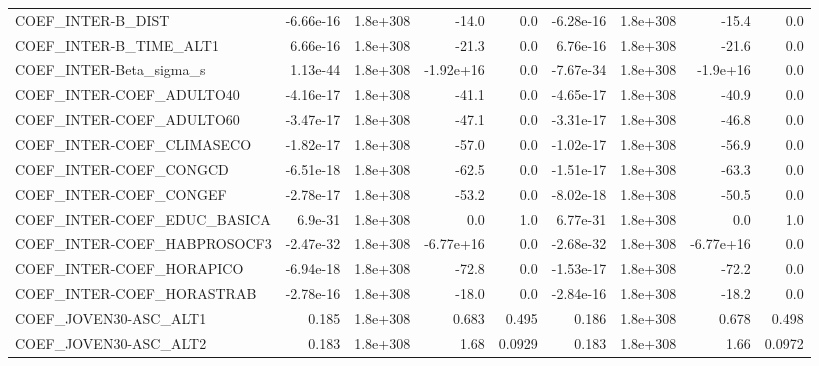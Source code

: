 \begin{tabular}{lrrrrrrrr}
COEF\_INTER-B\_DIST                 &   -6.66e-16 &     1.8e+308 &     -14.0 &      0.0 &  -6.28e-16 &    1.8e+308 &        -15.4 &           0.0 \\
COEF\_INTER-B\_TIME\_ALT1            &    6.66e-16 &     1.8e+308 &     -21.3 &      0.0 &   6.76e-16 &    1.8e+308 &        -21.6 &           0.0 \\
COEF\_INTER-Beta\_sigma\_s           &    1.13e-44 &     1.8e+308 & -1.92e+16 &      0.0 &  -7.67e-34 &    1.8e+308 &     -1.9e+16 &           0.0 \\
COEF\_INTER-COEF\_ADULTO40          &   -4.16e-17 &     1.8e+308 &     -41.1 &      0.0 &  -4.65e-17 &    1.8e+308 &        -40.9 &           0.0 \\
COEF\_INTER-COEF\_ADULTO60          &   -3.47e-17 &     1.8e+308 &     -47.1 &      0.0 &  -3.31e-17 &    1.8e+308 &        -46.8 &           0.0 \\
COEF\_INTER-COEF\_CLIMASECO         &   -1.82e-17 &     1.8e+308 &     -57.0 &      0.0 &  -1.02e-17 &    1.8e+308 &        -56.9 &           0.0 \\
COEF\_INTER-COEF\_CONGCD            &   -6.51e-18 &     1.8e+308 &     -62.5 &      0.0 &  -1.51e-17 &    1.8e+308 &        -63.3 &           0.0 \\
COEF\_INTER-COEF\_CONGEF            &   -2.78e-17 &     1.8e+308 &     -53.2 &      0.0 &  -8.02e-18 &    1.8e+308 &        -50.5 &           0.0 \\
COEF\_INTER-COEF\_EDUC\_BASICA       &     6.9e-31 &     1.8e+308 &       0.0 &      1.0 &   6.77e-31 &    1.8e+308 &          0.0 &           1.0 \\
COEF\_INTER-COEF\_HABPROSOCF3       &   -2.47e-32 &     1.8e+308 & -6.77e+16 &      0.0 &  -2.68e-32 &    1.8e+308 &    -6.77e+16 &           0.0 \\
COEF\_INTER-COEF\_HORAPICO          &   -6.94e-18 &     1.8e+308 &     -72.8 &      0.0 &  -1.53e-17 &    1.8e+308 &        -72.2 &           0.0 \\
COEF\_INTER-COEF\_HORASTRAB         &   -2.78e-16 &     1.8e+308 &     -18.0 &      0.0 &  -2.84e-16 &    1.8e+308 &        -18.2 &           0.0 \\
COEF\_JOVEN30-ASC\_ALT1             &       0.185 &     1.8e+308 &     0.683 &    0.495 &      0.186 &    1.8e+308 &        0.678 &         0.498 \\
COEF\_JOVEN30-ASC\_ALT2             &       0.183 &     1.8e+308 &      1.68 &   0.0929 &      0.183 &    1.8e+308 &         1.66 &        0.0972 \\

\end{tabular}
